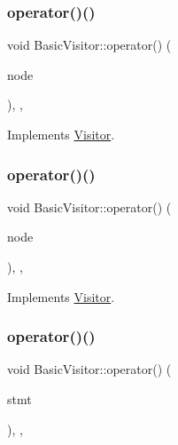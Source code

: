 \subsubsection{\texorpdfstring{operator()()}{operator()()}\hspace{0.1cm}{\footnotesize\ttfamily [23/60]}}
{\footnotesize\ttfamily void Basic\+Visitor\+::operator() (\begin{DoxyParamCaption}\item[{const \hyperlink{struct_function_expression}{Function\+Expression} \&}]{node }\end{DoxyParamCaption})\hspace{0.3cm}{\ttfamily [inline]}, {\ttfamily [override]}, {\ttfamily [virtual]}}



Implements \hyperlink{struct_visitor_a3f6eb67942d7e2c83a761de2bd66a60a}{Visitor}.

\mbox{\label{struct_basic_visitor_a6ab713b4b992eb420c89a2326e351fd3}} 
\subsubsection{\texorpdfstring{operator()()}{operator()()}\hspace{0.1cm}{\footnotesize\ttfamily [24/60]}}
{\footnotesize\ttfamily void Basic\+Visitor\+::operator() (\begin{DoxyParamCaption}\item[{const \hyperlink{struct_block}{Block} \&}]{node }\end{DoxyParamCaption})\hspace{0.3cm}{\ttfamily [inline]}, {\ttfamily [override]}, {\ttfamily [virtual]}}



Implements \hyperlink{struct_visitor_a3a26b45c1ab418661f992d97ed9ec9f0}{Visitor}.

\mbox{\label{struct_basic_visitor_afb110c94ddb7c8383f03541c76ff8bf7}} 
\subsubsection{\texorpdfstring{operator()()}{operator()()}\hspace{0.1cm}{\footnotesize\ttfamily [25/60]}}
{\footnotesize\ttfamily void Basic\+Visitor\+::operator() (\begin{DoxyParamCaption}\item[{const \hyperlink{struct_variable_statement}{Variable\+Statement} \&}]{stmt }\end{DoxyParamCaption})\hspace{0.3cm}{\ttfamily [inline]}, {\ttfamily [override]}, {\ttfamily [virtual]}}



